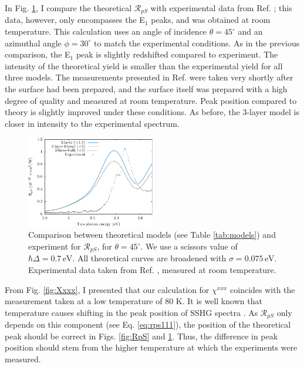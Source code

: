 In Fig. \ref{fig:mitchellRpS}, I compare the theoretical $\mathcal{R}_{pS}$ with experimental data from Ref. \cite{mitchellSS01}; this data, however, only encompasses the E$_{1}$ peaks, and was obtained at room temperature. This calculation uses an angle of incidence $\theta=45^\circ$ and an azimuthal angle $\phi=30^\circ$ to match the experimental conditions. As in the previous comparison, the E$_{1}$ peak is slightly redshifted compared to experiment. The intensity of the theoretical yield is smaller than the experimental yield for all three models. The measurements presented in Ref. \cite{mitchellSS01} were taken very shortly after the surface had been prepared, and the surface itself was prepared with a high degree of quality and measured at room temperature. Peak position compared to theory is slightly improved under these conditions. As before, the 3-layer model is closer in intensity to the experimental spectrum.

\begin{figure}[H]
\centering
\includegraphics[width=0.5\textwidth]{content/figures/fig-Si1x1-Mitchell_RpS}
\caption{Comparison between theoretical models (see Table \ref{tab:models}) and experiment for $\mathcal{R}_{pS}$, for $\theta=45^\circ$. We use a scissors value of $\hbar\Delta = 0.7\,\text{eV}$. All theoretical curves are broadened with $\sigma=0.075\,\text{eV}$. Experimental data taken from Ref. \cite{mitchellSS01}, measured at room temperature.}
\label{fig:mitchellRpS}
\end{figure}

From Fig. \ref{fig:Xxxx}, I presented that our calculation for $\chi^{xxx}$ coincides with the measurement taken at a low temperature of 80 K. It is well known that temperature causes shifting in the peak position of SSHG spectra \cite{dadapPRB97}. As $\mathcal{R}_{pS}$ only depends on this component (see Eq. \eqref{eq:rps111}), the position of the theoretical peak should be correct in Figs. \ref{fig:RpS} and \ref{fig:mitchellRpS}. Thus, the difference in peak position should stem from the higher temperature at which the experiments were measured.

